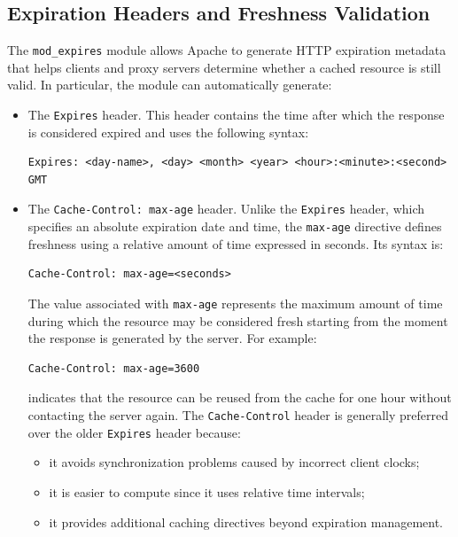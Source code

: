 \documentclass{scrbook}
\begin{document}
	\subsection{Expiration Headers and Freshness Validation}
	
	The \texttt{mod\_expires} module allows Apache to generate HTTP expiration metadata that helps clients and proxy servers determine whether a cached resource is still valid. In particular, the module can automatically generate:
	\begin{itemize}
		\item
		The \texttt{Expires} header. This header contains the time after which the response is considered expired and uses the following syntax:
		\begin{lstlisting}
Expires: <day-name>, <day> <month> <year> <hour>:<minute>:<second> GMT
		\end{lstlisting}
		
		\item
		The \texttt{Cache-Control: max-age} header. Unlike the \texttt{Expires} header, which specifies an absolute expiration date and time, the \texttt{max-age} directive defines freshness using a relative amount of time expressed in seconds. Its syntax is:
		
		\begin{lstlisting}
Cache-Control: max-age=<seconds>
		\end{lstlisting}
		
		The value associated with \texttt{max-age} represents the maximum amount of time during which the resource may be considered fresh starting from the moment the response is generated by the server. For example:
		
		\begin{lstlisting}
Cache-Control: max-age=3600
		\end{lstlisting}
		
		indicates that the resource can be reused from the cache for one hour without contacting the server again. The \texttt{Cache-Control} header is generally preferred over the older \texttt{Expires} header because:
		\begin{itemize}
			\item
			it avoids synchronization problems caused by incorrect client clocks;
			
			\item
			it is easier to compute since it uses relative time intervals;
			
			\item
			it provides additional caching directives beyond expiration management.
		\end{itemize}
		

\end{itemize}
\end{document}
